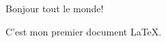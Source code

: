 \documentclass{article}
\begin{document}
Bonjour tout le monde!

C'est mon premier document LaTeX.
\end{document}
